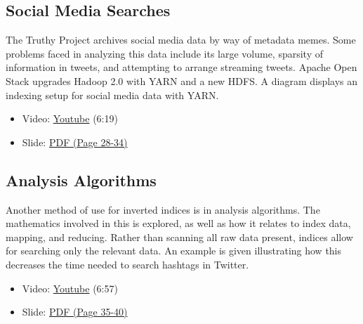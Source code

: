 \subsection{Social Media Searches}\label{social-media-searches}

The Truthy Project archives social media data by way of metadata memes.
Some problems faced in analyzing this data include its large volume,
sparsity of information in tweets, and attempting to arrange streaming
tweets. Apache Open Stack upgrades Hadoop 2.0 with YARN and a new HDFS.
A diagram displays an indexing setup for social media data with YARN.

\begin{itemize}

\item
  Video: \href{https://www.youtube.com/watch?v=a3tcL-Qw9to}{Youtube}
  (6:19)
\item
  Slide:
  \href{https://drive.google.com/open?id=0B88HKpainTSfWUh6dVNHcXloSnc}{PDF
  (Page 28-34)}
\end{itemize}

\subsection{Analysis Algorithms}\label{analysis-algorithms}

Another method of use for inverted indices is in analysis algorithms.
The mathematics involved in this is explored, as well as how it relates
to index data, mapping, and reducing. Rather than scanning all raw data
present, indices allow for searching only the relevant data. An example
is given illustrating how this decreases the time needed to search
hashtags in Twitter.

\begin{itemize}

\item
  Video: \href{https://www.youtube.com/watch?v=MxoMd4mdshE}{Youtube}
  (6:57)
\item
  Slide:
  \href{https://drive.google.com/open?id=0B88HKpainTSfWUh6dVNHcXloSnc}{PDF
  (Page 35-40)}
\end{itemize}
